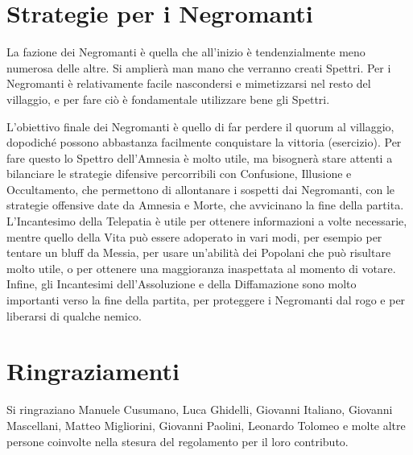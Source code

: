 \documentclass[a4paper,10pt]{article}
\begin{document}
\section{Strategie per i Negromanti}

La fazione dei Negromanti è quella che all'inizio è tendenzialmente meno numerosa delle altre. Si amplierà man mano che verranno creati Spettri. Per i Negromanti è relativamente facile nascondersi e mimetizzarsi nel resto del villaggio, e per fare ciò è fondamentale utilizzare bene gli Spettri.

L'obiettivo finale dei Negromanti è quello di far perdere il quorum al villaggio, dopodiché possono abbastanza facilmente conquistare la vittoria (esercizio). Per fare questo lo Spettro dell'Amnesia è molto utile, ma bisognerà stare attenti a bilanciare le strategie difensive percorribili con Confusione, Illusione e Occultamento, che permettono di allontanare i sospetti dai Negromanti, con le strategie offensive date da Amnesia e Morte, che avvicinano la fine della partita. L'Incantesimo della Telepatia è utile per ottenere informazioni a volte necessarie, mentre quello della Vita può essere adoperato in vari modi, per esempio per tentare un bluff da Messia, per usare un'abilità dei Popolani che può risultare molto utile, o per ottenere una maggioranza inaspettata al momento di votare. Infine, gli Incantesimi dell'Assoluzione e della Diffamazione sono molto importanti verso la fine della partita, per proteggere i Negromanti dal rogo e per liberarsi di qualche nemico.

\section{Ringraziamenti}

Si ringraziano Manuele Cusumano, Luca Ghidelli, Giovanni Italiano, Giovanni Mascellani, Matteo Migliorini, Giovanni Paolini, Leonardo Tolomeo e molte altre persone coinvolte nella stesura del regolamento per il loro contributo.
\end{document}
